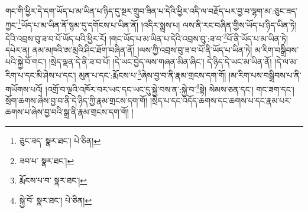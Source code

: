 གང་གི་ཕྱིར་དེ་དག་ཡོད་པ་མ་ཡིན་པ་ཉིད་དུ་སྔར་གྲུབ་ཟིན་པ་དེའི་ཕྱིར་འདི་ལ་བརྗོད་པར་བྱ་བ་ལྷག་མ་:ཅུང་ཟད་ཀྱང་\footnote{ཅུང་ཟད་  སྣར་ཐང་།  པེ་ཅིན། }ཡོད་པ་མ་ཡིན་ནོ་སྙམ་དུ་དགོངས་པ་ཡིན་ནོ། །འདིར་སྨྲས་པ། ལས་ནི་རང་བཞིན་གྱིས་ཡོད་པ་ཉིད་ཡིན་ཏེ། དེའི་འབྲས་བུ་ཟ་བ་པོ་ཡོད་པའི་ཕྱིར་རོ། །གང་ཡོད་པ་མ་ཡིན་པ་དེའི་འབྲས་བུ་:ཟ་བ་\footnote{ཟབ་པ་  སྣར་ཐང་། }པོ་ནི་ཡོད་པ་མ་ཡིན་ཏེ། དཔེར་ན། ནམ་མཁའི་ཨ་མྲའི་ཤིང་ཐོག་བཞིན་ནོ། །ལས་ཀྱི་འབྲས་བུ་ཟ་བ་པོ་ནི་ཡོད་པ་ཡིན་ཏེ། མ་རིག་བསྒྲིབས་པའི་སྐྱེ་བོ་གང་། །སྲེད་ལྡན་དེ་ནི་ཟ་བ་པོ། །དེ་ཡང་བྱེད་ལས་གཞན་མིན་ཞིང་། དེ་ཉིད་དེ་ཡང་མ་ཡིན་ནོ། །དེ་ལ་མ་རིག་པ་དང་མི་ཤེས་པ་དང་། མུན་པ་དང་:རྨོངས་པ་\footnote{རྨོངས་པ་བ་  སྣར་ཐང་། }ཞེས་བྱ་བ་ནི་རྣམ་གྲངས་དག་གོ། །མ་རིག་པས་བསྒྲིབས་པ་ནི་གཡོགས་པའོ། །འགྲོ་བ་ལྔའི་འཁོར་བར་ཡང་དང་ཡང་དུ་སྐྱེ་བས་ན་:སྐྱེ་བ་\footnote{སྐྱེ་བོ་  སྣར་ཐང་།  པེ་ཅིན། }སྟེ། སེམས་ཅན་དང་། གང་ཟག་དང་། སྲོག་ཆགས་ཞེས་བྱ་བ་ནི་དེ་ཉིད་ཀྱི་རྣམ་གྲངས་དག་གོ། །སྲེད་པ་དང་འདོད་ཆགས་དང་ཆགས་པ་དང་རྣམ་པར་ཆགས་པ་ཞེས་བྱ་བའི་སྒྲ་ནི་རྣམ་གྲངས་དག་གོ། །
